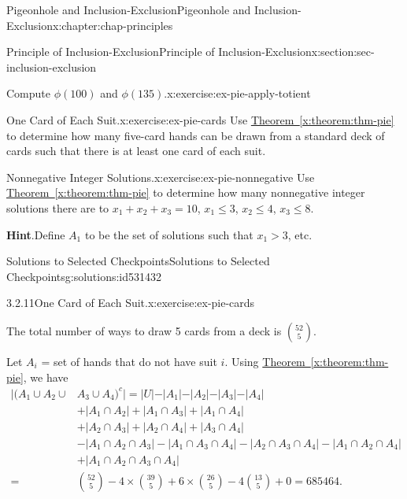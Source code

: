 \documentclass[oneside,10pt,]{book}
\newcommand{\blocktitlefont}{\relax}
\newcommand{\xreffont}{\relax}
\numberwithin{equation}{section}
\newcommand{\gt}{>}
\newcommand{\amp}{&}
\begin{document}
\begin{chapterptx}{Pigeonhole and Inclusion-Exclusion}{}{Pigeonhole and Inclusion-Exclusion}{}{}{x:chapter:chap-principles}
\begin{sectionptx}{Principle of Inclusion-Exclusion}{}{Principle of Inclusion-Exclusion}{}{}{x:section:sec-inclusion-exclusion}
\begin{inlineexercise}{Compute \(\phi(100)\) and \(\phi(135)\).}{x:exercise:ex-pie-apply-totient}
\end{inlineexercise}%
\begin{inlineexercise}{One Card of Each Suit.}{x:exercise:ex-pie-cards}%
Use \hyperref[x:theorem:thm-pie]{Theorem~{\xreffont\ref{x:theorem:thm-pie}}} to determine how many five-card hands can be drawn from a standard deck of cards such that there is at least one card of each suit.%
\end{inlineexercise}%
\begin{inlineexercise}{Nonnegative Integer Solutions.}{x:exercise:ex-pie-nonnegative}%
Use \hyperref[x:theorem:thm-pie]{Theorem~{\xreffont\ref{x:theorem:thm-pie}}} to determine how many nonnegative integer solutions there are to \(x_1 + x_2 + x_3 = 10\), \(x_1 \leq 3\), \(x_2 \leq 4\), \(x_3 \leq 8\).%
\par\smallskip%
\noindent\textbf{\blocktitlefont Hint}.\hypertarget{g:hint:id531369}{}\quad{}Define \(A_1\) to be the set of solutions such that \(x_1 \gt 3\), etc.%
\end{inlineexercise}%
%
%
\typeout{************************************************}
\typeout{************************************************}
%
\begin{solutions-subsection-numberless}{Solutions to Selected Checkpoints}{}{Solutions to Selected Checkpoints}{}{}{g:solutions:id531432}
\begin{inlinesolution}{3.2.11}{One Card of Each Suit.}{x:exercise:ex-pie-cards}%
\par\smallskip%
\noindent\hypertarget{g:solution:id531350-main}{}The total number of ways to draw 5 cards from a deck is \(\displaystyle\binom{52}{5}\).%
\par
Let \(A_i\) = set of hands that do not have suit \(i\). Using \hyperref[x:theorem:thm-pie]{Theorem~{\xreffont\ref{x:theorem:thm-pie}}}, we have%
\begin{align*}
|(A_1 \cup A_2 \cup \amp A_3 \cup A_4)^{c}| = |U| - |A_1| - |A_2| - |A_3| - |A_4| \\
\amp + |A_1 \cap A_2| + |A_1 \cap A_3| + |A_1 \cap A_4|\\
\amp + |A_2 \cap A_3| + |A_2 \cap A_4| + |A_3 \cap A_4|\\
\amp - |A_1 \cap A_2 \cap A_3| - |A_1 \cap A_3 \cap A_4| - |A_2 \cap A_3 \cap A_4| - |A_1 \cap A_2 \cap A_4|\\
\amp + |A_1 \cap A_2 \cap A_3 \cap A_4|\\
= \amp {{52}\choose{5}} - 4 \times {{39}\choose{5}} + 6 \times {{26}\choose{5}} - 4 {{13}\choose{5}} + 0 = 685464\text{.}

\end{align*}
\end{inlinesolution}
\end{solutions-subsection-numberless}
\end{sectionptx}
\end{chapterptx}
\end{document}
